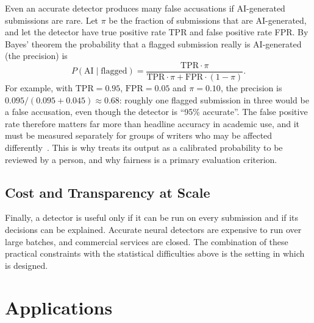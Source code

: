 Even an accurate detector produces many false accusations if AI-generated
submissions are rare. Let $\pi$ be the fraction of submissions that are
AI-generated, and let the detector have true positive rate TPR and false
positive rate FPR. By Bayes' theorem the probability that a flagged
submission really is AI-generated (the precision) is
\begin{equation}
  P(\text{AI} \mid \text{flagged}) = \frac{\mathrm{TPR}\cdot\pi}{\mathrm{TPR}\cdot\pi + \mathrm{FPR}\cdot(1-\pi)} .
  \label{eq:baserate}
\end{equation}
For example, with $\mathrm{TPR}=0.95$, $\mathrm{FPR}=0.05$ and $\pi = 0.10$,
the precision is $0.095/(0.095+0.045) \approx 0.68$: roughly one flagged
submission in three would be a false accusation, even though the detector is
``95\% accurate''. The false positive rate therefore matters far more than
headline accuracy in academic use, and it must be measured separately for
groups of writers who may be affected differently~\cite{liang2023biased}.
This is why \veriscript{} treats its output as a calibrated probability to be
reviewed by a person, and why fairness is a primary evaluation criterion.

\subsection{Cost and Transparency at Scale}

Finally, a detector is useful only if it can be run on every submission and if
its decisions can be explained. Accurate neural detectors are expensive to run
over large batches, and commercial services are closed. The combination of
these practical constraints with the statistical difficulties above is the
setting in which \veriscript{} is designed.

\section{Applications}

